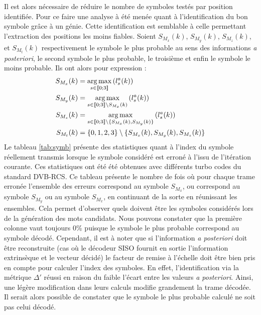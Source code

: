 Il est alors nécessaire de réduire le nombre de symboles testés par position identifiée. Pour ce faire une analyse à été 
menée quant à l'identification du bon symbole grâce à un génie. Cette identification est semblable à celle permettant 
l'extraction des positions les moins fiables.
Soient $S_{M_x}(k)$, $S_{M_y}(k)$, $S_{M_z}(k)$, et $S_{M_t}(k)$ respectivement le symbole le plus probable au sens 
des informations \textit{a posteriori}, le second symbole le plus probable, le troisième et enfin le symbole le moins 
probable. Ils ont alors pour expression :
\begin{align*}
S_{M_x}(k) &= \operatorname*{arg\,max}\limits_{s\in\llbracket0;3\rrbracket}\left(l^a_s(k)\right) \\
S_{M_y}(k) &= \operatorname*{arg\,max}\limits_{s\in\llbracket0;3\rrbracket\setminus{S_{M_x}(k)}}\left(l^a_s(k)\right)\\
S_{M_z}(k) &= \operatorname*{arg\,max}\limits_{s\in\llbracket0;3\rrbracket\setminus{\{S_{M_x}(k)}, S_{M_y}(k)\}}\left(l^a_s(k)\right)\\
S_{M_t}(k) &= \{0,1,2,3\}\setminus{\{S_{M_x}(k), S_{M_y}(k), S_{M_z}(k)\}}
\end{align*}
Le tableau \ref{tab:symb} présente des statistiques quant à l'index du symbole réellement transmis lorsque le symbole 
considéré est erroné à l'issu de l'itération courante. Ces statistiques ont été été obtenues avec différents turbo
codes du standard DVB-RCS. Ce tableau présente le nombre de fois où pour chaque trame erronée l'ensemble des erreurs 
correspond au symbole $S_{M_x}$, ou correspond au symbole $S_{M_y}$ ou au symbole $S_{M_x}$, en continuant de la sorte en 
réunissant les ensembles. Cela permet d'observer quels doivent être les symboles considérés lors de la génération des 
mots candidats. Nous pouvons constater que la première colonne vaut toujours 0\% puisque le symbole le plus probable correspond au
symbole décodé. Cependant, il est à noter que si l'information \textit{a posteriori} doit être reconstruite (cas où le 
décodeur SISO fournit en sortie l'information extrinsèque et le vecteur décidé) le facteur de remise à l'échelle doit 
être bien pris en compte pour calculer l'index des symboles. En effet, l'identification via la métrique $\Delta'$ réussi 
en raison du faible l'écart entre les valeurs \textit{a posteriori}. Ainsi, une légère modification dans leurs calculs 
modifie grandement la trame décodée. Il serait alors possible de constater que le symbole le plus probable calculé ne
soit pas celui décodé.
